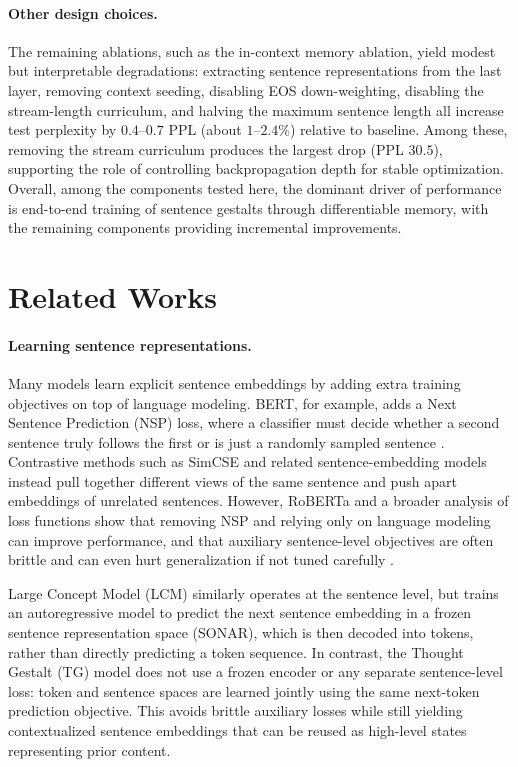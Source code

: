 \documentclass{article}
\begin{document}
\paragraph{Other design choices.}
The remaining ablations, such as the in-context memory ablation, yield modest but interpretable degradations: extracting sentence representations from the last layer, removing context seeding, disabling EOS down-weighting, disabling the stream-length curriculum, and halving the maximum sentence length all increase test perplexity by $0.4$--$0.7$ PPL (about $1$--$2.4\%$) relative to baseline. 
Among these, removing the stream curriculum produces the largest drop (PPL $30.5$), supporting the role of controlling backpropagation depth for stable optimization. 
Overall, among the components tested here, the dominant driver of performance is end-to-end training of sentence gestalts through differentiable memory, with the remaining components providing incremental improvements.

\section{Related Works}

\paragraph{Learning sentence representations.}
Many models learn explicit sentence embeddings by adding extra training objectives on top of language modeling. 
BERT, for example, adds a Next Sentence Prediction (NSP) loss, where a classifier must decide whether a second sentence truly follows the first or is just a randomly sampled sentence \citep{devlin2019bert}. 
Contrastive methods such as SimCSE \citep{gao2021simcse} and related sentence-embedding models \citep{reimers2019sentence,cer2018universal,kiros2015skip,logeswaran2018quick} instead pull together different views of the same sentence and push apart embeddings of unrelated sentences.
However, RoBERTa and a broader analysis of loss functions show that removing NSP and relying only on language modeling can improve performance, and that auxiliary sentence-level objectives are often brittle and can even hurt generalization if not tuned carefully \citep{liu2019roberta,Aroca-Ouellette2020OnLosses}.

Large Concept Model (LCM) \citep{BarraultLCM2024} similarly operates at the sentence level, but trains an autoregressive model to predict the next sentence embedding in a frozen sentence representation space (SONAR), which is then decoded into tokens, rather than directly predicting a token sequence. In contrast, the Thought Gestalt (TG) model does not use a frozen encoder or any separate sentence-level loss: token and sentence spaces are learned jointly using the same next-token prediction objective. This avoids brittle auxiliary losses while still yielding contextualized sentence embeddings that can be reused as high-level states representing prior content.
\end{document}
